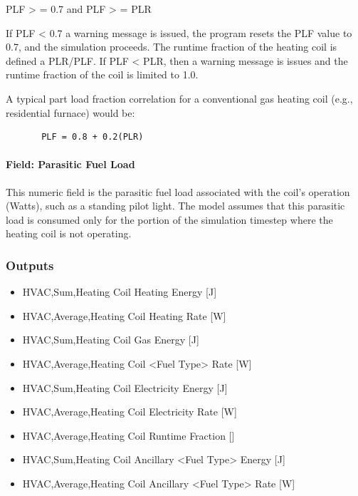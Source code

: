 PLF \textgreater{} = 0.7 and PLF \textgreater{} = PLR

If PLF \textless{} 0.7 a warning message is issued, the program resets the PLF value to 0.7, and the simulation proceeds. The runtime fraction of the heating coil is defined a PLR/PLF. If PLF \textless{} PLR, then a warning message is issues and the runtime fraction of the coil is limited to 1.0.

A typical part load fraction correlation for a conventional gas heating coil (e.g., residential furnace) would be:

\begin{lstlisting}
       PLF = 0.8 + 0.2(PLR)
\end{lstlisting}

\paragraph{Field: Parasitic Fuel Load}\label{field-parasitic-gas-load}

This numeric field is the parasitic fuel load associated with the coil's operation (Watts), such as a standing pilot light. The model assumes that this parasitic load is consumed only for the portion of the simulation timestep where the heating coil is not operating.

\subsubsection{Outputs}\label{outputs-9-002}

\begin{itemize}
\item
  HVAC,Sum,Heating Coil Heating Energy {[}J{]}
\item
  HVAC,Average,Heating Coil Heating Rate {[}W{]}
\item
  HVAC,Sum,Heating Coil Gas Energy {[}J{]}
\item
  HVAC,Average,Heating Coil <Fuel Type> Rate {[}W{]}
\item
  HVAC,Sum,Heating Coil Electricity Energy {[}J{]}
\item
  HVAC,Average,Heating Coil Electricity Rate {[}W{]}
\item
  HVAC,Average,Heating Coil Runtime Fraction {[]}
\item
  HVAC,Sum,Heating Coil Ancillary <Fuel Type> Energy {[}J{]}
\item
  HVAC,Average,Heating Coil Ancillary <Fuel Type> Rate {[}W{]}
\end{itemize}

